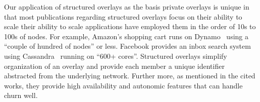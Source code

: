 \documentclass[conference]{IEEEtran}
\begin{document}
Our application of structured overlays as the basis private overlays is unique
in that most publications regarding structured overlays focus on their ability
to scale their ability to scale applications have employed them in the order of
10s to 100s of nodes.  For example, Amazon's shopping cart runs on
Dynamo~\cite{dynamo} using a ``couple of hundred of nodes'' or less.  Facebook
provides an inbox search system using Cassandra~\cite{cassandra} running on
``600+ cores''.  Structured overlays simplify organization of an overlay and
provide each member a unique identifier abstracted from the underlying network.
Further more, as mentioned in the cited works, they provide high availability
and autonomic features that can handle churn well.




\suppressfloats
\end{document}
